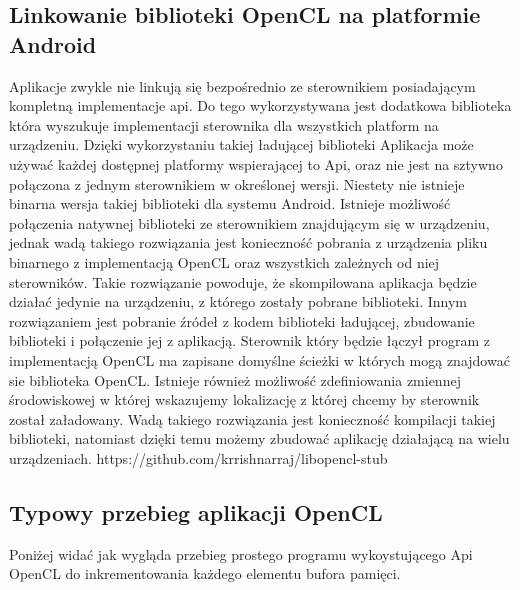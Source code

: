 \subsection{Linkowanie biblioteki OpenCL na platformie Android}
Aplikacje zwykle nie linkują się bezpośrednio ze sterownikiem posiadającym kompletną implementacje api. Do tego wykorzystywana jest dodatkowa biblioteka która wyszukuje implementacji sterownika dla wszystkich platform na urządzeniu. Dzięki wykorzystaniu takiej ładującej biblioteki Aplikacja może używać każdej dostępnej platformy wspierającej to Api, oraz nie jest na sztywno połączona z jednym sterownikiem w określonej wersji.
Niestety nie istnieje binarna wersja takiej biblioteki dla systemu Android. Istnieje możliwość połączenia natywnej biblioteki ze sterownikiem znajdującym się w urządzeniu, jednak wadą takiego rozwiązania jest konieczność pobrania z urządzenia pliku binarnego z implementacją OpenCL oraz wszystkich zależnych od niej sterowników. Takie rozwiązanie powoduje, że skompilowana aplikacja będzie działać jedynie na urządzeniu, z którego zostały pobrane biblioteki.
Innym rozwiązaniem jest pobranie źródeł z kodem biblioteki ładującej, zbudowanie biblioteki i połączenie jej z aplikacją. Sterownik który będzie łączył program z implementacją OpenCL ma zapisane domyślne ścieżki w których mogą znajdować sie biblioteka OpenCL. Istnieje również możliwość zdefiniowania zmiennej środowiskowej w której wskazujemy lokalizację z której chcemy by sterownik został załadowany. Wadą takiego rozwiązania jest konieczność kompilacji takiej biblioteki, natomiast dzięki temu możemy zbudować aplikację działającą na wielu urządzeniach.
https://github.com/krrishnarraj/libopencl-stub

\subsection{Typowy przebieg aplikacji OpenCL}
Poniżej widać jak wygląda przebieg prostego programu wykoystującego Api OpenCL do inkrementowania każdego elementu bufora pamięci.



